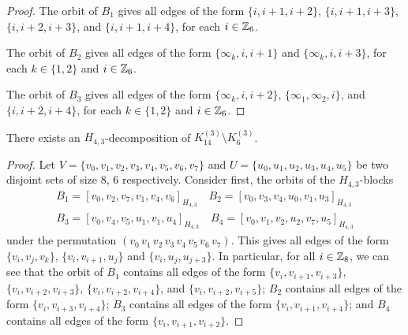 \begin{subappendices}
\begin{proof}
The orbit of $B_1$ gives all edges of the form $\{i, i+1, i+2\}$, $\{i, i+1, i+3\}$, $\{i, i+2, i+3\}$, and $\{i, i+1, i+4\}$, for each $i \in \mathbb{Z}_6$.

The orbit of $B_2$ gives all edges of the form $\{\infty_k, i, i+1\}$ and $\{\infty_k, i, i+3\}$, for each $k \in \{1, 2\}$ and $i \in \mathbb{Z}_6$.

The orbit of $B_3$ gives all edges of the form $\{\infty_k, i, i+2\}$, $\{\infty_1, \infty_2, i\}$, and $\{i, i+2, i+4\}$, for each $k \in \{1, 2\}$ and $i \in \mathbb{Z}_6$.
\end{proof}


\begin{example} \label{eg:H_43-k14-k6}
There exists an $H_{4,3}$-decomposition of $K_{14}^{(3)} \setminus K_{6}^{(3)}$.
\end{example}

\begin{proof}
Let $V = \{v_0, v_1, v_2, v_3, v_4, v_5, v_6, v_7\}$ and $U = \{u_0, u_1, u_2,
u_3, u_4, u_5\}$ be two disjoint sets of size 8, 6 respectively. Consider first, the orbits of the $H_{4,3}$-blocks
\begin{align*}
    B_1 = [v_0, v_2, v_7, v_1, v_4, v_6]_{H_{4,3}} \quad
    B_2 = [v_0, v_3, v_4, u_0, v_1, u_3]_{H_{4,3}} \\
    B_3 = [v_0, v_4, v_5, u_1, v_1, u_4]_{H_{4,3}} \quad
    B_4 = [v_0, v_1, v_2, u_2, v_7, u_5]_{H_{4,3}}
\end{align*}
under the permutation $(v_0 \, v_1 \, v_2 \, v_3 \, v_4 \, v_5 \, v_6 \, v_7)$.
This gives all edges of the form $\{v_i, v_j, v_k\}$, $\{v_i, v_{i+1}, u_j\}$ and $\{v_i, u_j, u_{j+3}\}$.
In particular, for all $i \in \mathbb{Z}_8$,
we can see that the orbit of $B_1$ contains all edges of the form $\{v_i, v_{i+1}, v_{i+3}\}$, $\{v_i, v_{i+2}, v_{i+3}\}$, $\{v_i, v_{i+2}, v_{i+4}\}$, and $\{v_i, v_{i+2}, v_{i+5}\}$;
$B_2$ contains all edges of the form $\{v_i, v_{i+3}, v_{i+4}\}$; $B_3$ contains all edges of the form $\{v_i, v_{i+1}, v_{i+4}\}$; and $B_4$ contains all edges of the form $\{v_i, v_{i+1}, v_{i+2}\}$.


\end{proof}
\end{subappendices}
